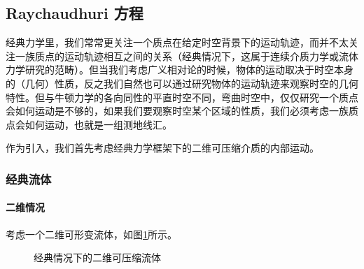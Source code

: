 \documentclass[hyperref, UTF8, a4paper]{ctexart}
\begin{document}
\subsection{Raychaudhuri 方程}

经典力学里，我们常常更关注一个质点在给定时空背景下的运动轨迹，而并不太关注一族质点的运动轨迹相互之间的关系（经典情况下，这属于连续介质力学或流体力学研究的范畴）。但当我们考虑广义相对论的时候，物体的运动取决于时空本身的（几何）性质，反之我们自然也可以通过研究物体的运动轨迹来观察时空的几何特性。但与牛顿力学的各向同性的平直时空不同，弯曲时空中，仅仅研究一个质点会如何运动是不够的，如果我们要观察时空某个区域的性质，我们必须考虑一族质点会如何运动，也就是一组测地线汇。



作为引入，我们首先考虑经典力学框架下的二维可压缩介质的内部运动。


\subsubsection{经典流体}
\paragraph{二维情况}

考虑一个二维可形变流体，如图\ref{classic fluid}所示。

\begin{figure}
	\centering
	
	\caption{经典情况下的二维可压缩流体}
	\label{classic fluid}
\end{figure}
\end{document}
